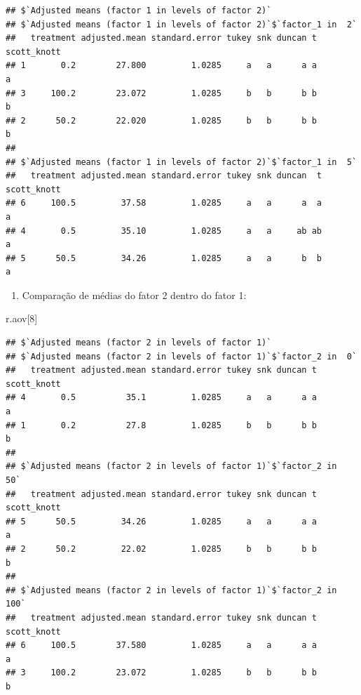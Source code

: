 \documentclass[
]{article}
\newenvironment{Shaded}{\begin{snugshade}}{\end{snugshade}}
\newcommand{\DecValTok}[1]{\textcolor[rgb]{0.00,0.00,0.81}{#1}}
\newcommand{\NormalTok}[1]{#1}
\providecommand{\tightlist}{%
  \setlength{\itemsep}{0pt}\setlength{\parskip}{0pt}}
\begin{document}
\begin{verbatim}
## $`Adjusted means (factor 1 in levels of factor 2)`
## $`Adjusted means (factor 1 in levels of factor 2)`$`factor_1 in  2`
##   treatment adjusted.mean standard.error tukey snk duncan t scott_knott
## 1       0.2        27.800         1.0285     a   a      a a           a
## 3     100.2        23.072         1.0285     b   b      b b           b
## 2      50.2        22.020         1.0285     b   b      b b           b
## 
## $`Adjusted means (factor 1 in levels of factor 2)`$`factor_1 in  5`
##   treatment adjusted.mean standard.error tukey snk duncan  t scott_knott
## 6     100.5         37.58         1.0285     a   a      a  a           a
## 4       0.5         35.10         1.0285     a   a     ab ab           a
## 5      50.5         34.26         1.0285     a   a      b  b           a
\end{verbatim}

\begin{enumerate}
\def\labelenumi{\arabic{enumi}.}
\setcounter{enumi}{1}
\tightlist
\item
  Comparação de médias do fator 2 dentro do fator 1:
\end{enumerate}

\begin{Shaded}
\begin{Highlighting}[]
\NormalTok{r.aov[}\DecValTok{8}\NormalTok{]}
\end{Highlighting}
\end{Shaded}

\begin{verbatim}
## $`Adjusted means (factor 2 in levels of factor 1)`
## $`Adjusted means (factor 2 in levels of factor 1)`$`factor_2 in  0`
##   treatment adjusted.mean standard.error tukey snk duncan t scott_knott
## 4       0.5          35.1         1.0285     a   a      a a           a
## 1       0.2          27.8         1.0285     b   b      b b           b
## 
## $`Adjusted means (factor 2 in levels of factor 1)`$`factor_2 in  50`
##   treatment adjusted.mean standard.error tukey snk duncan t scott_knott
## 5      50.5         34.26         1.0285     a   a      a a           a
## 2      50.2         22.02         1.0285     b   b      b b           b
## 
## $`Adjusted means (factor 2 in levels of factor 1)`$`factor_2 in  100`
##   treatment adjusted.mean standard.error tukey snk duncan t scott_knott
## 6     100.5        37.580         1.0285     a   a      a a           a
## 3     100.2        23.072         1.0285     b   b      b b           b
\end{verbatim}
\end{document}
